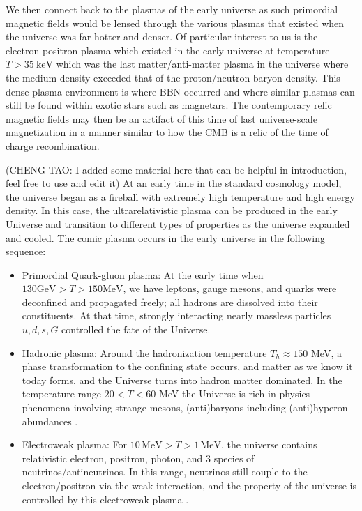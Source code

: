 \documentclass[Universe,article,submit,moreauthors,pdftex]{Definitions/mdpi}
\begin{document}
We then connect back to the plasmas of the early universe as such primordial magnetic fields would be lensed through the various plasmas that existed when the universe was far hotter and denser. Of particular interest to us is the electron-positron plasma which existed in the early universe at temperature $T>35\ \mathrm{keV}$ which was the last matter/anti-matter plasma in the universe where the medium density exceeded that of the proton/neutron baryon density. This dense plasma environment is where BBN occurred and where similar plasmas can still be found within exotic stars such as magnetars. The contemporary relic magnetic fields may then be an artifact of this time of last universe-scale magnetization in a manner similar to how the CMB is a relic of the time of charge recombination. 

{\color{blue}
(CHENG TAO: I added some material here that can be helpful in introduction, feel free to use and edit it) At an early time in the standard cosmology model, the universe began as a fireball with extremely high temperature and high energy density. In this case, the ultrarelativistic plasma can be produced in the early Universe and  transition to different types of properties as the universe expanded and cooled. The comic plasma occurs in the early universe in the following sequence:
\begin{itemize}
 \item Primordial Quark-gluon plasma: At the early time when $130\mathrm{GeV}>T>150\mathrm{MeV}$, we have leptons, gauge mesons, and quarks were deconfined and propagated freely; all hadrons are dissolved into their constituents. At that time, strongly interacting nearly massless particles $u,d,s,G$ controlled the fate of the Universe.
 \item Hadronic plasma: Around the hadronization temperature $T_h\approx150$ MeV, a phase transformation to the confining state occurs, and matter as we know it today forms,  and the Universe turns into hadron matter dominated. In the temperature range $ 20 < T < 60$ MeV the Universe is rich in physics phenomena involving strange mesons, (anti)baryons including (anti)hyperon abundances \cite{Fromerth:2012fe,Yang:2021bko}.
 \item  Electroweak plasma: For $10\,\mathrm{MeV}>T>1\,\mathrm{MeV}$, the universe contains relativistic electron, positron, photon, and $3$ species of neutrinos/antineutrinos. In this range, neutrinos still couple to the electron/positron via the weak interaction, and the property of the universe is controlled by this electroweak plasma \cite{Birrell:2012gg}.

\end{itemize}}
\end{document}

